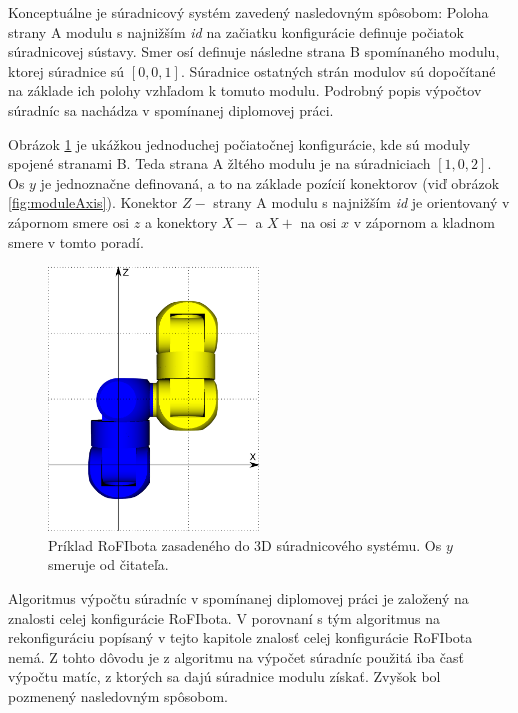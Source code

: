 \documentclass[
  digital, %
  oneside, %
  table,   %
  lof,     %
  nolot,     %
]{fithesis3}
\begin{document}
Konceptuálne je súradnicový systém zavedený nasledovným spôsobom: Poloha strany A modulu s najnižším \textit{id} na začiatku konfigurácie definuje počiatok súradnicovej sústavy. Smer osí definuje následne strana B spomínaného modulu, ktorej súradnice sú $[0, 0, 1]$. Súradnice ostatných strán modulov sú dopočítané na základe ich polohy vzhľadom k tomuto modulu. Podrobný popis výpočtov súradníc sa nachádza v spomínanej diplomovej práci.  

Obrázok \ref{fig:moduleCoordinates} je ukážkou jednoduchej počiatočnej konfigurácie, kde sú moduly spojené stranami B. Teda strana A žltého modulu je na súradniciach $[1, 0, 2]$. Os $y$ je jednoznačne definovaná, a to na základe pozícií konektorov (viď obrázok \ref{fig:moduleAxis}). Konektor $Z-$ strany A modulu s najnižším \textit{id} je orientovaný v zápornom smere osi $z$ a konektory $X-$ a $X+$ na osi $x$ v zápornom a kladnom smere v tomto poradí. 

\begin{figure}[hbt!]
    \centering
    \includegraphics[width=0.5\textwidth]{pictures/module_coordinates.pdf}
    \caption[Ukážka súradnicového systému]{Príklad RoFIbota zasadeného do 3D súradnicového systému. Os $y$ smeruje od čitateľa. }
    \label{fig:moduleCoordinates}
\end{figure}

Algoritmus výpočtu súradníc v spomínanej diplomovej práci je založený na znalosti celej konfigurácie RoFIbota. V porovnaní s tým algoritmus na rekonfiguráciu popísaný v tejto kapitole znalosť celej konfigurácie RoFIbota nemá. Z tohto dôvodu je z algoritmu na výpočet súradníc použitá iba časť výpočtu matíc, z ktorých sa dajú súradnice modulu získať. Zvyšok bol pozmenený nasledovným spôsobom. 
\end{document}
